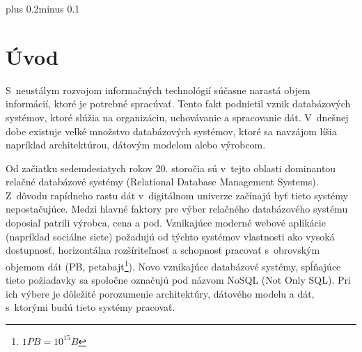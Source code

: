 \documentclass[11pt,twoside,a4paper]{book}
\begin{document}
\tableofcontents



\listoffigures



\listoftables



\mainbodystarts
\normalfont
{}\baselineskip plus 0.2\baselineskip minus 0.1\baselineskip



% 
% 

\chapter{Úvod}
S~neustálym rozvojom informačných technológií súčasne narastá objem informácií, ktoré je potrebné spracúvať. Tento fakt podnietil vznik databázových systémov, ktoré slúžia na organizáciu, uchovávanie a spracovanie dát. V~dnešnej dobe existuje veľké množstvo databázových systémov, ktoré sa navzájom líšia napríklad architektúrou, dátovým modelom alebo výrobcom.

Od začiatku sedemdesiatych rokov 20. storočia sú v~tejto oblasti dominantou relačné databázové systémy (Relational Database Management Systems). Z~dôvodu rapídneho rastu dát v~digitálnom univerze \cite{Gantz_Mcarthur_Minton_2007} začínajú byť tieto systémy nepostačujúce. Medzi hlavné faktory pre výber relačného databázového systému doposiaľ patrili výrobca, cena a pod. Vznikajúce moderné webové aplikácie (napríklad sociálne siete) požadujú od týchto systémov vlastnosti ako vysoká dostupnosť, horizontálna rozšíriteľnosť a schopnosť pracovať s~obrovským objemom dát (PB, petabajt\footnote{$ 1PB = 10^{15} B$}). Novo vznikajúce databázové systémy, spĺňajúce tieto požiadavky sa spoločne označujú pod názvom NoSQL (Not Only SQL). Pri ich výbere je dôležité porozumenie architektúry, dátového modelu a dát, s~ktorými budú tieto systémy pracovať.
\end{document}
